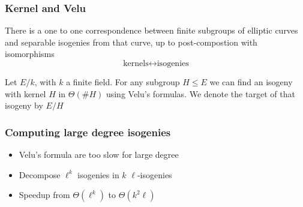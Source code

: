 \documentclass{beamer}
\begin{document}
\begin{frame}
    \frametitle{Kernel and Velu}
    \begin{theorem}
       There is a one to one correspondence between finite subgroups of elliptic curves 
       and separable isogenies from that curve, up to post-compostion with isomorphisms
       \pause
       \[ \text{kernels} \longleftrightarrow \text{isogenies} \]

    \end{theorem}
    \pause
       Let $E/k$, with $k$ a finite field. For any subgroup $H \leq E$ we can find an 
       isogeny with kernel $H$ in $\Theta(\#H)$ using Velu's formulas. We denote the target of 
       that isogeny by $E/H$
    
\end{frame}

\begin{frame}
    \frametitle{Computing large degree isogenies}
    \begin{itemize}
        \item<1-> Velu's formula are too slow for large degree
        \item<2-> Decompose $\ell^k$ isogenies in $k$ $\ell$-isogenies
        \item<3-> Speedup from $\Theta(\ell^k)$ to $\Theta(k^2 \ell)$
    \end{itemize}

\end{frame}
\end{document}
